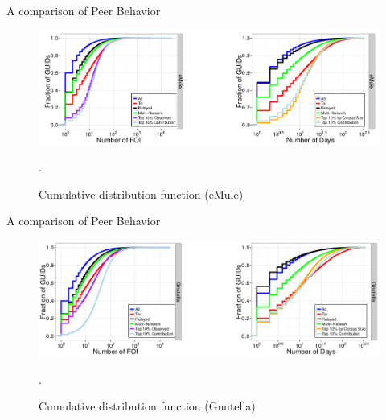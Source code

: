 \documentclass[notes]{beamer}
\begin{document}
\begin{frame}

\begin{block}{A comparison of Peer Behavior}

\begin{figure}[!htb]
\centering
\includegraphics[scale=0.35]{CDF_characterization_emule}
\caption{Cumulative distribution function (eMule)}.
\label{fig:CDF_characterization_emule}
\end{figure}

\end{block}

\end{frame}

\begin{frame}

\begin{block}{A comparison of Peer Behavior}

\begin{figure}[!htb]
\centering
\includegraphics[scale=0.35]{CDF_characterization_gnutella}
\caption{Cumulative distribution function (Gnutella)}.
\label{fig:CDF_characterization_gnutella}
\end{figure}

\end{block}

\end{frame}
\end{document}
